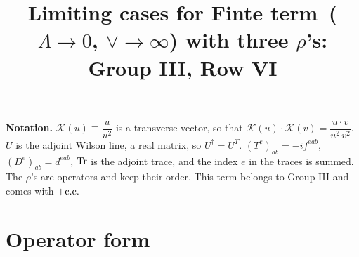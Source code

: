 \documentclass[9pt]{article}
\title{Limiting cases for Finte term\, ($\Lambda\to 0$, $\vee\to \infty$) with three $\rho$'s: Group III, Row VI}
\author{}
\date{}
\numberwithin{equation}{section}
\begin{document}
\maketitle
\noindent\textbf{Notation.} $\mathcal{K}(u)\equiv\dfrac{u}{u^{2}}$ is a transverse vector, so that $\mathcal{K}(u)\cdot\mathcal{K}(v)=\dfrac{u\cdot v}{u^{2}\,v^{2}}$. $U$ is the adjoint Wilson line, a real matrix, so $U^{\dagger}=U^{T}$. $(T^{e})_{ab}=-if^{eab}$, $(D^{e})_{ab}=d^{eab}$, ${\rm Tr}$ is the adjoint trace, and the index $e$ in the traces is summed. The $\rho$'s are operators and keep their order. This term belongs to Group III and comes with $+{\rm c.c.}$

\section{Operator form}
\end{document}
